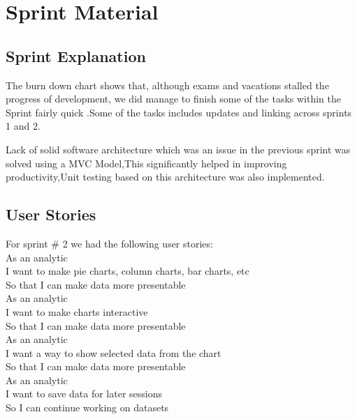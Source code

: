 \section{Sprint Material} %
\label{sec:Sprint Material}
\subsection{Sprint Explanation}
The burn down chart shows that, although exams and vacations stalled the progress of development, we did manage to finish some of the tasks within the Sprint fairly quick  .Some of the tasks includes updates and linking across sprints 1 and 2.

Lack of solid software architecture which was an issue in the previous sprint was solved using a MVC Model,This significantly helped in improving productivity,Unit testing based on this architecture was also implemented.
\subsection{User Stories}
For sprint \# 2 we had the following user stories: \\
As an analytic \\
I want to make pie charts, column charts, bar charts, etc \\
So that I can make data more presentable \\

As an analytic \\
I want to make charts interactive  \\
So that I can make data more presentable \\

As an analytic \\
I want a way to show selected data from the chart \\
So that I can make data more presentable\\

As an analytic \\
I want to save data for later sessions \\
So I can continue working on datasets \\

